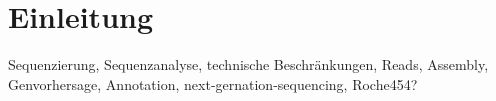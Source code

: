 \chapter{Einleitung}
Sequenzierung, Sequenzanalyse, technische Beschränkungen, Reads, Assembly,
Genvorhersage, Annotation, next-gernation-sequencing, Roche454?
